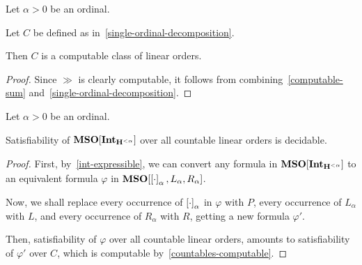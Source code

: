\begin{corollary}\label{countables-computable}
  Let $\alpha > 0$ be an ordinal.

  Let $C$ be defined as in~\cref{single-ordinal-decomposition}.

  Then $C$ is a computable class of linear orders.
\end{corollary}

\begin{proof}
  Since $\gg$ is clearly computable,
  it follows from combining~\cref{computable-sum} and~\cref{single-ordinal-decomposition}.
\end{proof}

\begin{theorem}\label{single-ordinal-satisfiability}
  Let $\alpha > 0$ be an ordinal.

  Satisfiability of $\mathbf{MSO}[\mathbf{Int}_{\mathbf{H}_{}^{< \alpha}}]$
  over all countable linear orders is decidable.
\end{theorem}

\begin{proof}
  First, by~\cref{int-expressible}, we can convert
  any formula in $\mathbf{MSO}[\mathbf{Int}_{\mathbf{H}_{}^{< \alpha}}]$
  to an equivalent formula $\varphi$ in $\mathbf{MSO}[\left[ {\cdot} \right]_{\alpha}, L_{\alpha}, R_{\alpha}]$.

  Now, we shall replace every occurrence of $\left[ {\cdot} \right]_{\alpha}$ in $\varphi$ with $P$,
  every occurrence of $L_{\alpha}$ with $L$,
  and every occurrence of $R_{\alpha}$ with $R$,
  getting a new formula $\varphi'$.

  Then, satisfiability of $\varphi$ over all countable linear orders,
  amounts to satisfiability of $\varphi'$ over $C$,
  which is computable by~\cref{countables-computable}.
\end{proof}
